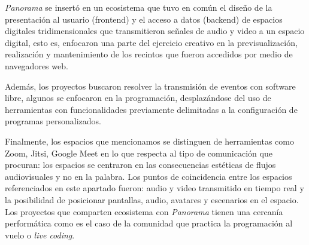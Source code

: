


\textit{Panorama} se insertó en un ecosistema que tuvo en común el diseño de la presentación al usuario (frontend) y el acceso a datos (backend) de espacios digitales tridimensionales que transmitieron señales de audio y video a un espacio digital, esto es, enfocaron una parte del ejercicio creativo en la previsualización, realización y mantenimiento de los recintos que fueron accedidos por medio de navegadores web.

Además, los proyectos buscaron resolver la transmisión de eventos con software libre, algunos se enfocaron en la programación, desplazándose del uso de herramientas con funcionalidades previamente delimitadas a la configuración de programas personalizados.

Finalmente, los espacios que mencionamos se distinguen de herramientas como Zoom, Jitsi, Google Meet en lo que respecta al tipo de comunicación que procuran: los espacios se centraron en las consecuencias estéticas de flujos audiovisuales y no en la palabra. Los puntos de coincidencia entre los espacios referenciados en este apartado fueron: audio y video transmitido en tiempo real y la posibilidad de posicionar pantallas, audio, avatares y escenarios en el espacio. Los proyectos que comparten ecosistema con \textit{Panorama} tienen una cercanía performática como es el caso de la comunidad que practica la programación al vuelo o \textit{live coding}.





